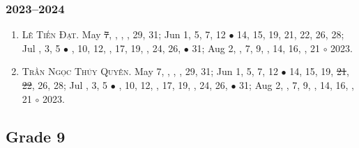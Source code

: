 \documentclass{article}
\begin{document}
\subsubsection{2023--2024}

\begin{enumerate}
	\item \textsc{Lê Tiến Đạt.} May \st{7}, , , , 29, 31; Jun 1, 5, 7, 12 $\bullet$ 14, 15, 19, 21, 22, 26, 28; Jul , 3, 5 $\bullet$ , 10, 12, , 17, 19, , 24, 26,  $\bullet$ 31; Aug 2, , 7, 9, , 14, 16, , 21 $\circ$ 2023.
	\item \textsc{Trần Ngọc Thúy Quyên.} May 7, , , , 29, 31; Jun 1, 5, 7, 12 $\bullet$ 14, 15, 19, \st{21}, \st{22}, 26, 28; Jul , 3, 5 $\bullet$ , 10, 12, , 17, 19, , 24, 26,  $\bullet$ 31; Aug 2, , 7, 9, , 14, 16, , 21 $\circ$ 2023.
\end{enumerate}


\subsection{Grade 9}
\end{document}
